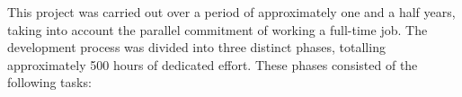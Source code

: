 
This project was carried out over a period of approximately one and a half years, taking into account the parallel commitment of working a full-time job. The development process was divided into three distinct phases, totalling approximately 500 hours of dedicated effort. These phases consisted of the following tasks:

